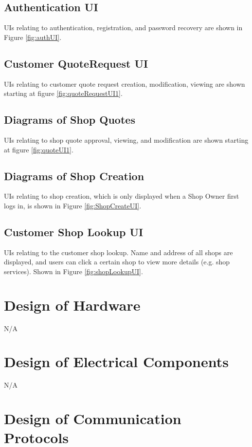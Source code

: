 \documentclass[12pt, titlepage]{article}
\begin{document}

\subsection{Authentication UI}
UIs relating to authentication, registration, and password recovery are shown in Figure \ref{fig:authUI}. 

\subsection{Customer QuoteRequest UI}
UIs relating to customer quote request creation, modification, viewing are shown starting at figure \ref{fig:quoteRequestUI1}.

\subsection{Diagrams of Shop Quotes}
UIs relating to shop quote approval, viewing, and modification are shown starting at figure \ref{fig:quoteUI1}.

\subsection{Diagrams of Shop Creation}
UIs relating to shop creation, which is only displayed when a Shop Owner first logs in, is shown in Figure \ref{fig:ShopCreateUI}.

\subsection{Customer Shop Lookup UI}
UIs relating to the customer shop lookup. Name and address of all shops are displayed, and users can click a certain shop to view more details (e.g. shop services). Shown in Figure \ref{fig:shopLookupUI}.

\section{Design of Hardware}

N/A

\section{Design of Electrical Components}

N/A

\section{Design of Communication Protocols}
\end{document}

